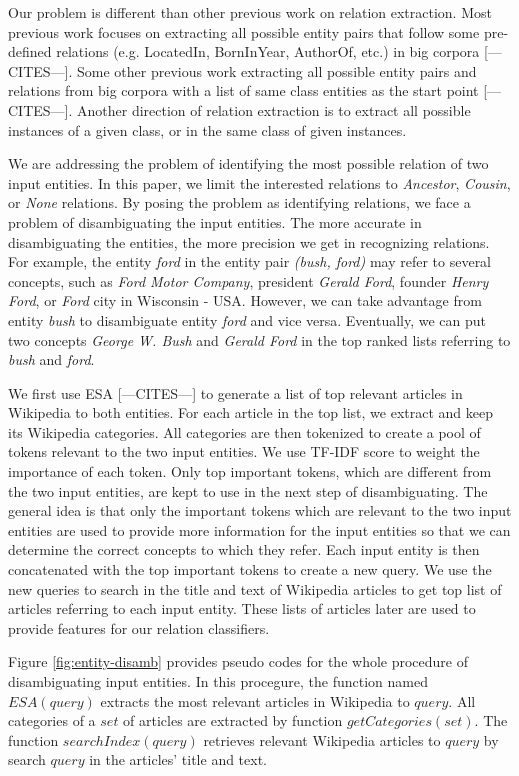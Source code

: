 Our problem is different than other previous work on relation
extraction. Most previous work focuses on extracting all possible
entity pairs that follow some pre-defined relations (e.g. LocatedIn,
BornInYear, AuthorOf, etc.) in big corpora [---CITES---]. Some other
previous work extracting all possible entity pairs and relations from
big corpora with a list of same class entities as the start point
[---CITES---]. Another direction of relation extraction is to extract
all possible instances of a given class, or in the same class of given
instances.

We are addressing the problem of identifying the most possible
relation of two input entities. In this paper, we limit the interested
relations to \emph{Ancestor}, \emph{Cousin}, or \emph{None} relations.
By posing the problem as identifying relations, we face a problem of
disambiguating the input entities. The more accurate in disambiguating
the entities, the more precision we get in recognizing relations. For
example, the entity \emph{ford} in the entity pair \emph{(bush, ford)}
may refer to several concepts, such as \emph{Ford Motor Company},
president \emph{Gerald Ford}, founder \emph{Henry Ford}, or
\emph{Ford} city in Wisconsin - USA. However, we can take advantage
from entity \emph{bush} to disambiguate entity \emph{ford} and vice
versa. Eventually, we can put two concepts \emph{George W. Bush} and
\emph{Gerald Ford} in the top ranked lists referring to \emph{bush}
and \emph{ford}.

We first use ESA [---CITES---] to generate a list of top relevant
articles in Wikipedia to both entities. For each article in the top
list, we extract and keep its Wikipedia categories. All categories are
then tokenized to create a pool of tokens relevant to the two input
entities.  We use TF-IDF score to weight the importance of each
token. Only top important tokens, which are different from the two
input entities, are kept to use in the next step of disambiguating.
The general idea is that only the important tokens which are relevant
to the two input entities are used to provide more information for the
input entities so that we can determine the correct concepts to which
they refer. Each input entity is then concatenated with the top
important tokens to create a new query. We use the new queries to
search in the title and text of Wikipedia articles to get top list of
articles referring to each input entity. These lists of articles later
are used to provide features for our relation classifiers.

Figure \ref{fig:entity-disamb} provides pseudo codes for the whole
procedure of disambiguating input entities. In this procegure, the
function named $ESA(query)$ extracts the most relevant articles in
Wikipedia to $query$.  All categories of a $set$ of articles are
extracted by function $getCategories(set)$. The function
$searchIndex(query)$ retrieves relevant Wikipedia articles to $query$
by search $query$ in the articles' title and text.

